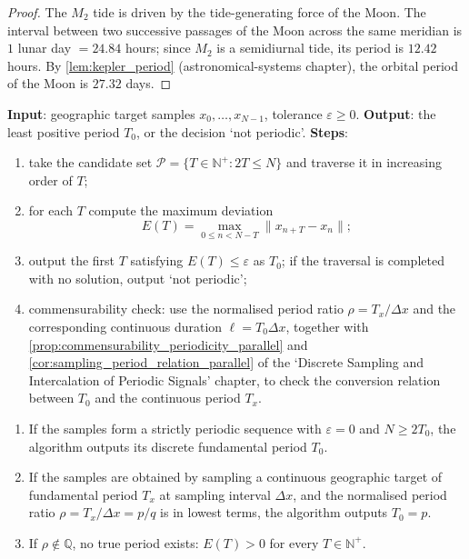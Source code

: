 \begin{proof}
The $M_2$ tide is driven by the tide-generating force of the Moon. The interval between two successive passages of the Moon across the same meridian is $1$ lunar day $=24.84$ hours; since $M_2$ is a semidiurnal tide, its period is $12.42$ hours. By \cref{lem:kepler_period} (astronomical-systems chapter), the orbital period of the Moon is $27.32$ days.
\end{proof}

\begin{definition}\label{def:geo_minimal_period_algorithm}
\textbf{Input}: geographic target samples $x_0,\dots,x_{N-1}$, tolerance $\varepsilon\ge0$.
\textbf{Output}: the least positive period $T_0$, or the decision `not periodic'.
\textbf{Steps}:
\begin{enumerate}[label=(\arabic*)]
    \item take the candidate set $\mathcal P=\{T\in\mathbb N^+:2T\le N\}$ and traverse it in increasing order of $T$;
    \item for each $T$ compute the maximum deviation
    \[
    E(T)=\max_{0\le n<N-T}\|x_{n+T}-x_n\|;
    \]
    \item output the first $T$ satisfying $E(T)\le\varepsilon$ as $T_0$; if the traversal is completed with no solution, output `not periodic';
    \item commensurability check: use the normalised period ratio $\rho=T_x/\Delta x$ and the corresponding continuous duration $\ell=T_0\Delta x$, together with \cref{prop:commensurability_periodicity_parallel} and \cref{cor:sampling_period_relation_parallel} of the `Discrete Sampling and Intercalation of Periodic Signals' chapter, to check the conversion relation between $T_0$ and the continuous period $T_x$.
\end{enumerate}
\end{definition}

\begin{theorem}\label{thm:geo_minimal_period_correctness}
\leavevmode\par
\begin{enumerate}[label=(\roman*)]
    \item If the samples form a strictly periodic sequence with $\varepsilon=0$ and $N\ge2T_0$, the algorithm outputs its discrete fundamental period $T_0$.
    \item If the samples are obtained by sampling a continuous geographic target of fundamental period $T_x$ at sampling interval $\Delta x$, and the normalised period ratio $\rho=T_x/\Delta x=p/q$ is in lowest terms, the algorithm outputs $T_0=p$.
    \item If $\rho\notin\mathbb Q$, no true period exists: $E(T)>0$ for every $T\in\mathbb N^+$.
\end{enumerate}
\end{theorem}

